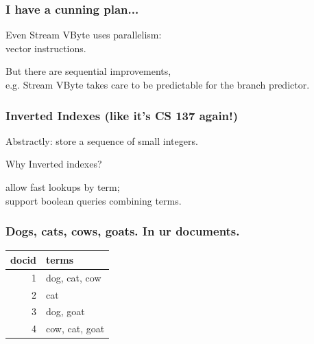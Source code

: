 \begin{frame}
\frametitle{I have a cunning plan...}


\begin{changemargin}{2cm}
Even Stream VByte uses parallelism:\\
\hspace*{2em}vector instructions. 

But there
are sequential improvements, \\
e.g. Stream VByte takes care to be predictable
for the branch predictor.
\end{changemargin}

\end{frame}
\begin{frame}
\frametitle{Inverted Indexes (like it's CS 137 again!)}


\begin{changemargin}{1cm}
\vspace*{-1em}
Abstractly: store a sequence of small integers.


Why Inverted indexes?

\hspace*{1cm}allow fast lookups by term;\\
\hspace*{1cm}support boolean queries combining terms.

\end{changemargin}

\end{frame}
\begin{frame}
\frametitle{Dogs, cats, cows, goats. In ur documents.}

\begin{changemargin}{2cm}
\begin{center}
\begin{tabular}{r|l}
docid & terms \\ \hline
1 & dog, cat, cow\\
2 & cat\\
3 & dog, goat\\
4 & cow, cat, goat\\
\end{tabular}
\end{center}
\end{changemargin}

\end{frame}


